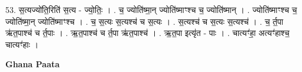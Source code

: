 \documentclass[17pt]{extarticle}
\begin{document}
53. स॒त्यज्यो॑ति॒रिति॑ स॒त्य - ज्यो॒तिः॒ । . च॒ ज्योति॑ष्मा॒न् ज्योति॑ष्माꣳश्च च॒ ज्योति॑ष्मान् । . ज्योति॑ष्माꣳश्च च॒ ज्योति॑ष्मा॒न् ज्योति॑ष्माꣳश्च । . च॒ स॒त्यः स॒त्यश्च॑ च स॒त्यः । . स॒त्यश्च॑ च स॒त्यः स॒त्यश्च॑ । . च॒ र्त॒पा ऋ॑त॒पाश्च॑ च र्त॒पाः । . ऋ॒त॒पाश्च॑ च र्त॒पा ऋ॑त॒पाश्च॑ । . ऋ॒त॒पा इत्यृ॑त - पाः । . चात्यꣳ॑हा॒ अत्यꣳ॑हाश्च॒ चात्यꣳ॑हाः । \newline

\textbf{Ghana Paata } \newline
\end{document}
